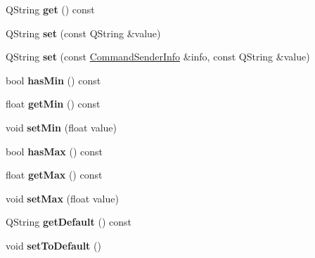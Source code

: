 \begin{DoxyCompactItemize}
\item 
\hypertarget{class_con_var_aeffed443f935c4081408a6a1268dd95d}{Q\-String {\bfseries get} () const }\label{class_con_var_aeffed443f935c4081408a6a1268dd95d}

\item 
\hypertarget{class_con_var_a3b2ed3c3d10884ebd282a80e35b6f13f}{Q\-String {\bfseries set} (const Q\-String \&value)}\label{class_con_var_a3b2ed3c3d10884ebd282a80e35b6f13f}

\item 
\hypertarget{class_con_var_a5c704cec9fa9849f60a1e7991a26ebf4}{Q\-String {\bfseries set} (const \hyperlink{class_command_sender_info}{Command\-Sender\-Info} \&info, const Q\-String \&value)}\label{class_con_var_a5c704cec9fa9849f60a1e7991a26ebf4}

\item 
\hypertarget{class_con_var_abbd3524ea974888b57f1b8d96dbdb66b}{bool {\bfseries has\-Min} () const }\label{class_con_var_abbd3524ea974888b57f1b8d96dbdb66b}

\item 
\hypertarget{class_con_var_a834692f5723ed688376aa64cc193a33a}{float {\bfseries get\-Min} () const }\label{class_con_var_a834692f5723ed688376aa64cc193a33a}

\item 
\hypertarget{class_con_var_a519205f9ca1c33dbd077a15fd1258777}{void {\bfseries set\-Min} (float value)}\label{class_con_var_a519205f9ca1c33dbd077a15fd1258777}

\item 
\hypertarget{class_con_var_a68f039f62cbff56805cfc446fae33afd}{bool {\bfseries has\-Max} () const }\label{class_con_var_a68f039f62cbff56805cfc446fae33afd}

\item 
\hypertarget{class_con_var_a2c8924d47e175d5398cc456a5b2bb514}{float {\bfseries get\-Max} () const }\label{class_con_var_a2c8924d47e175d5398cc456a5b2bb514}

\item 
\hypertarget{class_con_var_aa921cc271742dec3c946b1448db4161b}{void {\bfseries set\-Max} (float value)}\label{class_con_var_aa921cc271742dec3c946b1448db4161b}

\item 
\hypertarget{class_con_var_a06aa478aa7e68010aa3ca9122e29ea7a}{Q\-String {\bfseries get\-Default} () const }\label{class_con_var_a06aa478aa7e68010aa3ca9122e29ea7a}

\item 
\hypertarget{class_con_var_a64a961b8a329ae1da039d90e37902b69}{void {\bfseries set\-To\-Default} ()}\label{class_con_var_a64a961b8a329ae1da039d90e37902b69}


\end{DoxyCompactItemize}

